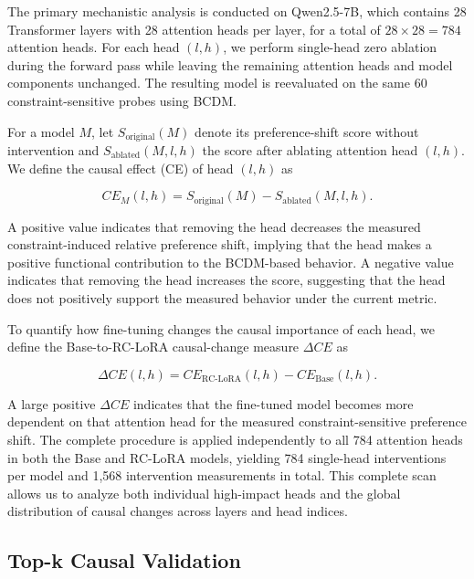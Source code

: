 The primary mechanistic analysis is conducted on Qwen2.5-7B, which contains 28 Transformer layers with 28 attention heads per layer, for a total of $28\times28=784$ attention heads. For each head $(l,h)$, we perform single-head zero ablation during the forward pass while leaving the remaining attention heads and model components unchanged. The resulting model is reevaluated on the same 60 constraint-sensitive probes using BCDM.

For a model $M$, let $S_{\mathrm{original}}(M)$ denote its preference-shift score without intervention and $S_{\mathrm{ablated}}(M,l,h)$ the score after ablating attention head $(l,h)$. We define the causal effect (CE) of head $(l,h)$ as

\begin{equation}
CE_M(l,h)
=
S_{\mathrm{original}}(M)
-
S_{\mathrm{ablated}}(M,l,h).
\label{eq:head_causal_effect}
\end{equation}

A positive value indicates that removing the head decreases the measured constraint-induced relative preference shift, implying that the head makes a positive functional contribution to the BCDM-based behavior. A negative value indicates that removing the head increases the score, suggesting that the head does not positively support the measured behavior under the current metric.

To quantify how fine-tuning changes the causal importance of each head, we define the Base-to-RC-LoRA causal-change measure $\Delta CE$ as

\begin{equation}
\Delta CE(l,h)
=
CE_{\mathrm{RC\text{-}LoRA}}(l,h)
-
CE_{\mathrm{Base}}(l,h).
\label{eq:delta_ce}
\end{equation}

A large positive $\Delta CE$ indicates that the fine-tuned model becomes more dependent on that attention head for the measured constraint-sensitive preference shift. The complete procedure is applied independently to all 784 attention heads in both the Base and RC-LoRA models, yielding 784 single-head interventions per model and 1,568 intervention measurements in total. This complete scan allows us to analyze both individual high-impact heads and the global distribution of causal changes across layers and head indices.

\subsection{Top-k Causal Validation}
\label{sec:topk_validation}

